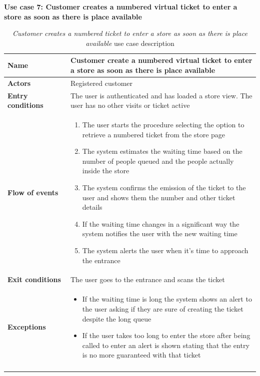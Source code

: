 \clearpage
\textbf{Use case 7: Customer creates a numbered virtual ticket to enter a store as soon as there is place available}
\smallskip
{}
\begin{longtable}{p{0.25\linewidth}p{0.75\linewidth}}
    \toprule
    \textbf{Name}             & \textbf{Customer create a numbered virtual ticket to enter a store as soon as there is place available} \\
    \midrule
    \textbf{Actors}           & Registered customer                                                                                     \\
    \midrule
    \textbf{Entry conditions} & The user is authenticated and has loaded a store view. The user has no other visits or ticket active    \\
    \midrule
    \textbf{Flow of events}   &
    \begin{enumerate}
        \item The user starts the procedure selecting the option to retrieve a numbered ticket from the store page
        \item The system estimates the waiting time based on the number of people queued and the people actually inside the store
        \item The system confirms the emission of the ticket to the user and shows them the number and other ticket details
        \item If the waiting time changes in a significant way the system notifies the user with the new waiting time
        \item The system alerts the user when it's time to approach the entrance
    \end{enumerate}                                                                                                          \\
    \midrule
    \textbf{Exit conditions}  & The user goes to the entrance and scans the ticket                                                      \\
    \midrule
    \textbf{Exceptions}       &
    \begin{itemize}
        \item If the waiting time is long the system shows an alert to the user asking if they are sure of creating the ticket despite the long queue
        \item If the user takes too long to enter the store after being called to enter an alert is shown stating that the entry is no more guaranteed with that ticket

    \end{itemize}                                                                                                          \\
    \bottomrule
    \caption{\emph{Customer creates a numbered ticket to enter a store as soon as there is place available} use case description}
\end{longtable}

